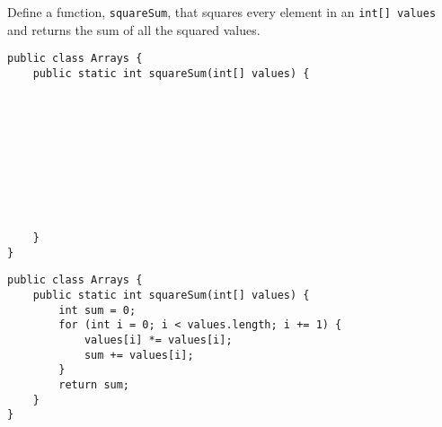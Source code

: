 \question Define a function, \texttt{squareSum}, that squares every element in an \texttt{int[] values} and returns the sum of all the squared values.

\ifprintanswers\else
\begin{lstlisting}
public class Arrays {
    public static int squareSum(int[] values) {










    }
}
\end{lstlisting}
\fi

\begin{solution}
\begin{lstlisting}
public class Arrays {
    public static int squareSum(int[] values) {
        int sum = 0;
        for (int i = 0; i < values.length; i += 1) {
            values[i] *= values[i];
            sum += values[i];
        }
        return sum;
    }
}
\end{lstlisting}
\end{solution}